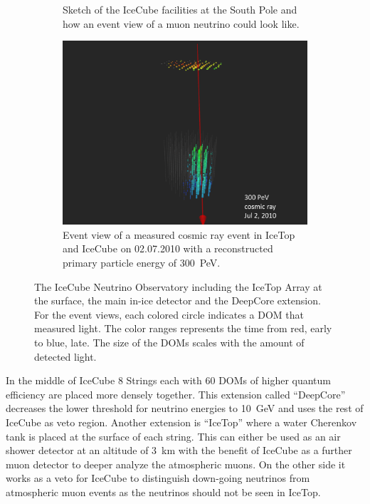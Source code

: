 \begin{figure}
\begin{subfigure}[t]{0.58\textwidth}
        \caption{Sketch of the IceCube facilities at the South Pole and how an event view of a muon neutrino could look like. \cite{IceCubePics}}
        \label{fig:icecube_detector}
    \end{subfigure}
    \hfill
    \begin{subfigure}[t]{0.38\textwidth}
        \centering
        \includegraphics[width=\textwidth]{./images/icecube_event_300_pev_2010_07_02.pdf}
        \caption{Event view of a measured cosmic ray event in IceTop and IceCube on 02.07.2010 with a reconstructed primary particle energy of \SI{300}{PeV}. \cite{IceCubePics}}
        \label{fig:icecube_event_view}
    \end{subfigure}
    \caption{The IceCube Neutrino Observatory including the IceTop Array at the surface, the main in-ice detector and the DeepCore extension. For the event views, each colored circle indicates a DOM that measured light. The color ranges represents the time from red, early to blue, late. The size of the DOMs scales with the amount of detected light.}
    \label{fig:icecube}
\end{figure}

In the middle of IceCube 8 Strings each with 60 DOMs of higher quantum efficiency are placed more densely together.
This extension called \enquote{DeepCore} decreases the lower threshold for neutrino energies to \SI{10}{GeV} and uses the rest of IceCube as veto region.
Another extension is \enquote{IceTop} where a water Cherenkov tank is placed at the surface of each string.
This can either be used as an air shower detector at an altitude of \SI{3}{km} with the benefit of IceCube as a further muon detector to deeper analyze the atmospheric muons.
On the other side it works as a veto for IceCube to distinguish down-going neutrinos from atmospheric muon events as the neutrinos should not be seen in IceTop.

